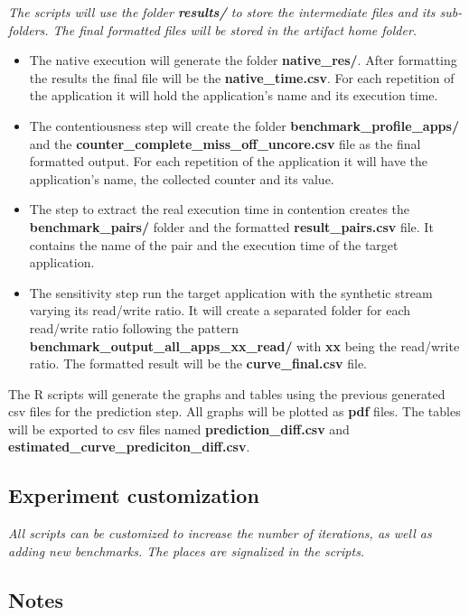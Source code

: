 \documentclass{sigplanconf}
\begin{document}
{{\em The scripts will use the folder {\bf results/} to store the intermediate files and its sub-folders. The final formatted files will be stored in the artifact home folder.
\begin{itemize}
\item The native execution will generate the folder {\bf native\_res/}. After formatting the results the final file will be the {\bf native\_time.csv}. For each repetition of the application it will hold the application's name and its execution time.
\item The contentiousness step will create the folder {\bf benchmark\_profile\_apps/} and the {\bf counter\_complete\_miss\_off\_uncore.csv} file as the final formatted output. For each repetition of the application it will have the application's name, the collected counter and its value.
\item The step to extract the real execution time in contention creates the {\bf benchmark\_pairs/} folder and the formatted {\bf result\_pairs.csv} file. It contains the name of the pair and the execution time of the target application.
\item The sensitivity step run the target application with the synthetic stream varying its read/write ratio. It will create a separated folder for each read/write ratio following the pattern {\bf benchmark\_output\_all\_apps\_xx\_read/} with {\bf xx} being the read/write ratio. The formatted result will be the {\bf curve\_final.csv} file.
\end{itemize}
The R scripts will generate the graphs and tables using the previous generated csv files for the prediction step. All graphs will be plotted as {\bf pdf} files. The tables will be exported to csv files named {\bf prediction\_diff.csv} and {\bf estimated\_curve\_prediciton\_diff.csv}.  
}

\subsection{Experiment customization}

{\em All scripts can be customized to increase the number of iterations, as well as adding new benchmarks. The places are signalized in the scripts.
}

\subsection{Notes}

}
\end{document}
